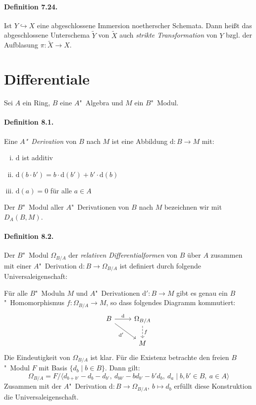 \paragraph{Definition 7.24.}\label{7.24} Ist $Y\hookrightarrow X$ eine abgeschlossene Immersion noetherscher Schemata. Dann heißt das abgeschlossene Unterschema $\widetilde{Y}$ von $\widetilde{X}$ auch \textit{strikte Transformation} von $Y$ bzgl. der Aufblasung $\pi:\widetilde{X}\to X$.

\section{Differentiale}

Sei $A$ ein Ring, $B$ eine $A$"~Algebra und $M$ ein $B$"~Modul.

\paragraph{Definition 8.1.}\label{8.1} Eine \textit{$A$"~Derivation} von $B$ nach $M$ ist eine Abbildung $\mathrm{d}:B\to M$ mit:
\begin{enumerate}[(i)]
\item $\mathrm{d}$ ist additiv
\item $\mathrm{d}(b\cdot b')=b\cdot \mathrm{d}(b')+ b'\cdot \mathrm{d}(b)$
\item $\mathrm{d}(a)=0$ für alle $a\in A$
\end{enumerate}
Der $B$"~Modul aller $A$"~Derivationen von $B$ nach $M$ bezeichnen wir mit $D_A(B,M)$.

\paragraph{Definition 8.2.}\label{8.2} Der $B$"~Modul $\Omega_{B/A}$ der \textit{relativen Differentialformen} von $B$ über $A$ zusammen mit einer $A$"~Derivation $\mathrm{d}:B\to\Omega_{B/A}$ ist definiert durch folgende Universaleigenschaft:

Für alle $B$"~Moduln $M$ und $A$"~Derivationen $\mathrm{d}':B\to M$ gibt es genau ein $B$"~Ho\-mo\-mor\-phis\-mus $f:\Omega_{B/A}\to M$, so dass folgendes Diagramm kommutiert:
\[\begin{tikzcd}
B\ar[r, "\mathrm{d}"]\ar[rd, "\mathrm{d}'"'] & \Omega_{B/A}\ar[d, "f", dashed]\\
& M
\end{tikzcd}\]
Die Eindeutigkeit von $\Omega_{B/A}$ ist klar. Für die Existenz betrachte den freien $B$"~Modul $F$ mit Basis $\{d_b\mid b\in B\}$. Dann gilt:
\[\Omega_{B/A}=F / \langle d_{b+b'}-d_b-d_{b'},\ d_{bb'}-bd_{b'}-b'd_b,\ d_a\mid b,b'\in B,\ a\in A\rangle \]
Zusammen mit der $A$"~Derivation $\mathrm{d}:B\to\Omega_{B/A},\ b\mapsto d_b$ erfüllt diese Konstruktion die Universaleigenschaft.

